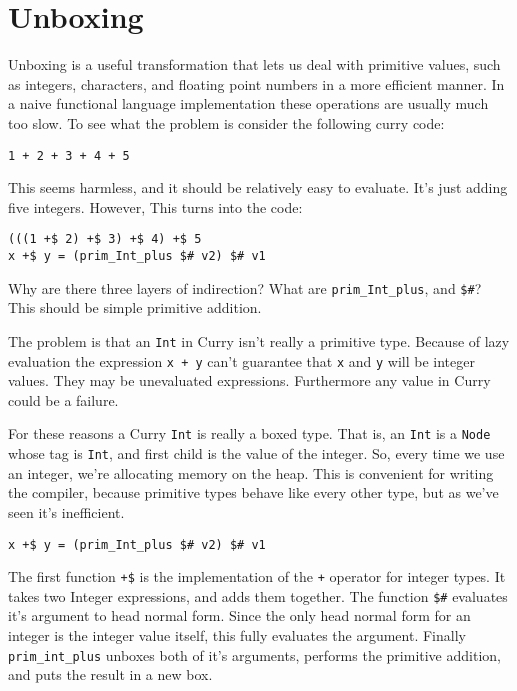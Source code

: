 \documentclass{article}
\begin{document}
\section{Unboxing}
Unboxing is a useful transformation that lets us deal with primitive values, 
such as integers, characters, and floating point numbers in a more efficient manner.
In a naive functional language implementation these operations are usually much too slow.
To see what the problem is consider the following curry code:

\begin{verbatim}
1 + 2 + 3 + 4 + 5
\end{verbatim}

This seems harmless, and it should be relatively easy to evaluate.
It's just adding five integers.
However, This turns into the code:

\begin{verbatim}
(((1 +$ 2) +$ 3) +$ 4) +$ 5
x +$ y = (prim_Int_plus $# v2) $# v1
\end{verbatim}

Why are there three layers of indirection?
What are \texttt{prim\_Int\_plus}, and \texttt{\$\#}?
This should be simple primitive addition.

The problem is that an \texttt{Int} in Curry isn't really a primitive type.
Because of lazy evaluation the expression \texttt{x + y} can't guarantee that
\texttt x and \texttt y will be integer values.  They may be unevaluated expressions.
Furthermore any value in Curry could be a failure.

For these reasons a Curry \texttt{Int} is really a boxed type.
That is, an \texttt{Int} is a \texttt{Node} whose tag is \texttt{Int}, and first child is the value of the integer.
So, every time we use an integer, we're allocating memory on the heap.
This is convenient for writing the compiler, because primitive types behave like every other type,
but as we've seen it's inefficient.

\begin{verbatim}
x +$ y = (prim_Int_plus $# v2) $# v1
\end{verbatim}

The first function \texttt{+\$} is the implementation of the \texttt{+} operator for integer types.
It takes two Integer expressions, and adds them together.
The function \texttt{\$\#} evaluates it's argument to head normal form.
Since the only head normal form for an integer is the integer value itself, this fully evaluates the argument.
Finally \texttt{prim\_int\_plus} unboxes both of it's arguments, performs the primitive addition,
and puts the result in a new box.
\end{document}
